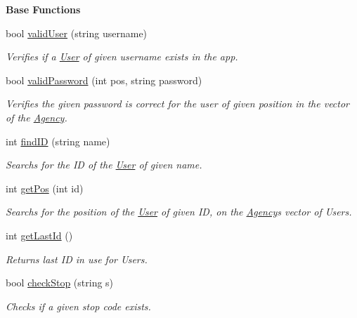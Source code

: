 \begin{Indent}\textbf{ Base Functions}\par
\begin{DoxyCompactItemize}
\item 
bool \hyperlink{class_agency_a633274c6bc861317f03bf378e5286312}{valid\+User} (string username)
\begin{DoxyCompactList}\small\item\em Verifies if a \hyperlink{class_user}{User} of given username exists in the app. \end{DoxyCompactList}\item 
bool \hyperlink{class_agency_a12c6a13fdeaaa5a2adab736313b3d180}{valid\+Password} (int pos, string password)
\begin{DoxyCompactList}\small\item\em Verifies the given password is correct for the user of given position in the vector of the \hyperlink{class_agency}{Agency}. \end{DoxyCompactList}\item 
int \hyperlink{class_agency_ab129c30ae0ba6c735d0f600c1b00894d}{find\+ID} (string name)
\begin{DoxyCompactList}\small\item\em Searchs for the ID of the \hyperlink{class_user}{User} of given name. \end{DoxyCompactList}\item 
int \hyperlink{class_agency_a7ec884913bb5c9803cc5b71dc4a569d3}{get\+Pos} (int id)
\begin{DoxyCompactList}\small\item\em Searchs for the position of the \hyperlink{class_user}{User} of given ID, on the \hyperlink{class_agency}{Agency}\textquotesingle{}s vector of Users. \end{DoxyCompactList}\item 
int \hyperlink{class_agency_a4f91eb604ad3eb3ea8142b8ab65b968d}{get\+Last\+Id} ()
\begin{DoxyCompactList}\small\item\em Returns last ID in use for Users. \end{DoxyCompactList}\item 
bool \hyperlink{class_agency_a5de11a6e7a081abefea2560290d542b6}{check\+Stop} (string s)
\begin{DoxyCompactList}\small\item\em Checks if a given stop code exists. \end{DoxyCompactList}\item 

\end{DoxyCompactItemize}
\end{Indent}
